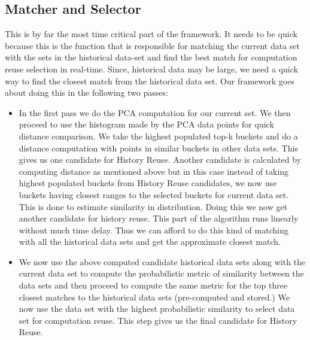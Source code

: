 \subsection{Matcher and Selector}
This is by far the most time critical part of the framework. It needs to be quick because this is the function that is responsible for matching the current data set with the sets in the historical data-set and find the best match for computation reuse selection in real-time. Since, historical data may be large, we need a quick way to find the closest match from the historical data set. Our framework goes about doing this in the following two passes:
\begin{itemize}
    \item In the first pass we do the PCA computation for our current set. We then proceed to use the histogram made by the PCA data points for quick distance comparison. We take the highest populated top-k buckets and do a distance computation with points in similar buckets in other data sets. This gives us one candidate for History Reuse. Another candidate is calculated by computing distance as mentioned above but in this case instead of taking highest populated buckets from History Reuse candidates, we now use buckets having closest ranges to the selected buckets for current data set. This is done to estimate similarity in distribution. Doing this we now get another candidate for history reuse. This part of the algorithm runs linearly without much time delay. Thus we can afford to do this kind of matching with all the historical data sets and get the approximate closest match.
    
    \item We now use the above computed candidate historical data sets along with the current data set to compute the probabilistic metric of similarity between the data sets and then proceed to compute the same metric for the top three closest matches to the historical data sets (pre-computed and stored.) We now use the data set with the highest probabilistic similarity to select data set for computation reuse. This step gives us the final candidate for History Reuse.
\end{itemize}

